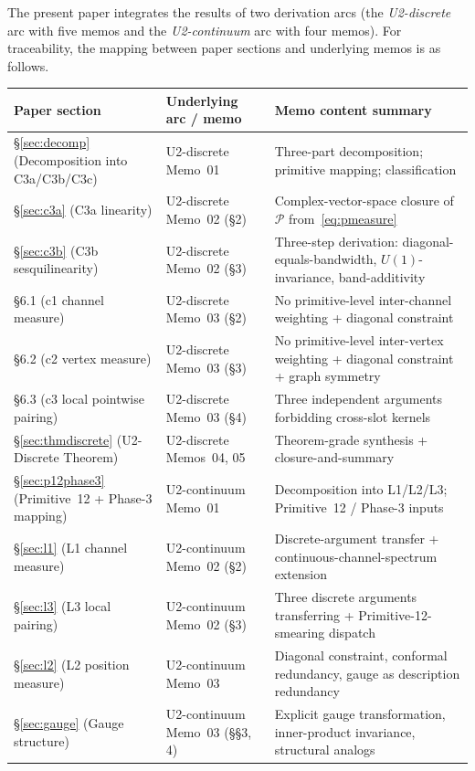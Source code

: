 \documentclass[11pt,a4paper]{article}
\begin{document}
The present paper integrates the results of two derivation arcs (the \emph{U2-discrete} arc with five memos and the \emph{U2-continuum} arc with four memos). For traceability, the mapping between paper sections and underlying memos is as follows.

\begin{center}
\begin{tabular}{p{4.5cm}p{2.6cm}p{6.8cm}}
\hline
Paper section & Underlying arc / memo & Memo content summary \\
\hline
\S\ref{sec:decomp} (Decomposition into C3a/C3b/C3c) & U2-discrete Memo~01 & Three-part decomposition; primitive mapping; classification \\
\S\ref{sec:c3a} (C3a linearity) & U2-discrete Memo~02 (\S 2) & Complex-vector-space closure of $\mathcal{P}$ from~\eqref{eq:pmeasure} \\
\S\ref{sec:c3b} (C3b sesquilinearity) & U2-discrete Memo~02 (\S 3) & Three-step derivation: diagonal-equals-bandwidth, $U(1)$-invariance, band-additivity \\
\S 6.1 (c1 channel measure) & U2-discrete Memo~03 (\S 2) & No primitive-level inter-channel weighting + diagonal constraint \\
\S 6.2 (c2 vertex measure) & U2-discrete Memo~03 (\S 3) & No primitive-level inter-vertex weighting + diagonal constraint + graph symmetry \\
\S 6.3 (c3 local pointwise pairing) & U2-discrete Memo~03 (\S 4) & Three independent arguments forbidding cross-slot kernels \\
\S\ref{sec:thmdiscrete} (U2-Discrete Theorem) & U2-discrete Memos~04, 05 & Theorem-grade synthesis + closure-and-summary \\
\S\ref{sec:p12phase3} (Primitive~12 + Phase-3 mapping) & U2-continuum Memo~01 & Decomposition into L1/L2/L3; Primitive~12 / Phase-3 inputs \\
\S\ref{sec:l1} (L1 channel measure) & U2-continuum Memo~02 (\S 2) & Discrete-argument transfer + continuous-channel-spectrum extension \\
\S\ref{sec:l3} (L3 local pairing) & U2-continuum Memo~02 (\S 3) & Three discrete arguments transferring + Primitive-12-smearing dispatch \\
\S\ref{sec:l2} (L2 position measure) & U2-continuum Memo~03 & Diagonal constraint, conformal redundancy, gauge as description redundancy \\
\S\ref{sec:gauge} (Gauge structure) & U2-continuum Memo~03 (\S\S 3, 4) & Explicit gauge transformation, inner-product invariance, structural analogs \\

\end{tabular}
\end{center}
\end{document}
